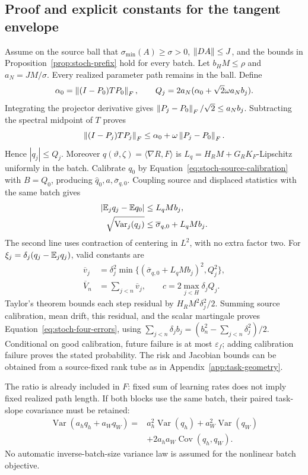 \subsection{Proof and explicit constants for the tangent envelope}
Assume on the source ball that $\sigma_{\min}(A)\ge\sigma>0$, $\left\lVert DA\right\rVert\le J$, and the bounds in Proposition~\ref{prop:stoch-prefix} hold for every batch. Let $b_HM\le\rho$ and $a_N=JM/\sigma$. Every realized parameter path remains in the ball. Define
\begin{equation}
 \alpha_0=\left\lVert (I-P_0)TP_0\right\rVert_F,\qquad
 Q_j=2a_N(\alpha_0+\sqrt2\omega a_Nb_j).
\end{equation}
Integrating the projector derivative gives $\left\lVert P_j-P_0\right\rVert_F/\sqrt2\le a_Nb_j$. Subtracting the spectral midpoint of $T$ proves
\begin{equation}
 \left\lVert (I-P_j)TP_j\right\rVert_F\le\alpha_0+\omega\left\lVert P_j-P_0\right\rVert_F.
\end{equation}
Hence $|q_j|\le Q_j$. Moreover $q(\vartheta,\zeta)=\langle\nabla R,F\rangle$ is $L_q=H_RM+G_RK_F$-Lipschitz uniformly in the batch. Calibrate $q_0$ by Equation~\eqref{eq:stoch-source-calibration} with $B=Q_0$, producing $\widehat q_0,a,\overline\sigma_{q,0}$. Coupling source and displaced statistics with the same batch gives
\begin{align}
 |\mathbb E_jq_j-\mathbb E q_0|&\le L_qMb_j,\\
 \sqrt{\operatorname{Var}_j(q_j)}&\le\overline\sigma_{q,0}+L_qMb_j.
\end{align}
The second line uses contraction of centering in $L^2$, with no extra factor two. For $\xi_j=\delta_j(q_j-\mathbb E_jq_j)$, valid constants are
\begin{align}
 \overline v_j&=\delta_j^2\min\{(\overline\sigma_{q,0}+L_qMb_j)^2,Q_j^2\},\\
 \overline V_n&=\sum_{j<n}\overline v_j,\qquad
 c=2\max_{j<H}\delta_jQ_j.
 \label{eq:stoch-tangent-variance}
\end{align}
Taylor's theorem bounds each step residual by $H_RM^2\delta_j^2/2$. Summing source calibration, mean drift, this residual, and the scalar martingale proves Equation~\eqref{eq:stoch-four-errors}, using $\sum_{j<n}\delta_jb_j=(b_n^2-\sum_{j<n}\delta_j^2)/2$. Conditional on good calibration, future failure is at most $\varepsilon_f$; adding calibration failure proves the stated probability. The risk and Jacobian bounds can be obtained from a source-fixed rank tube as in Appendix~\ref{app:task-geometry}.

The ratio is already included in $F$: fixed sum of learning rates does not imply fixed realized path length. If both blocks use the same batch, their paired task-slope covariance must be retained:
\begin{align}
 \operatorname{Var}(a_hq_h+a_Wq_W)
 ={}&a_h^2\operatorname{Var}(q_h)+a_W^2\operatorname{Var}(q_W)\nonumber\\
 &+2a_ha_W\operatorname{Cov}(q_h,q_W).
\end{align}
No automatic inverse-batch-size variance law is assumed for the nonlinear batch objective.

